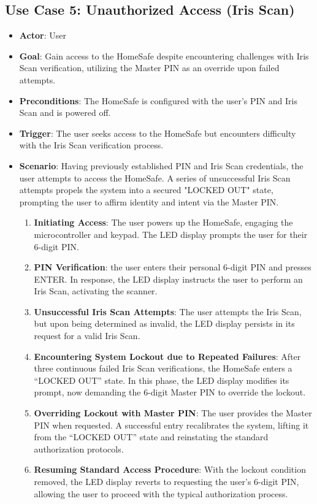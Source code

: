 \documentclass{article}
\begin{document}
\subsection{Use Case 5: Unauthorized Access (Iris Scan)}
\begin{itemize}
    \item \textbf{Actor}: User
    \item \textbf{Goal}: Gain access to the HomeSafe despite encountering challenges with Iris Scan verification, utilizing the Master PIN as an override upon failed attempts.
    \item \textbf{Preconditions}:  The HomeSafe is configured with the user’s PIN and Iris Scan and is powered off.
    \item \textbf{Trigger}: The user seeks access to the HomeSafe but encounters difficulty with the Iris Scan verification process.
    \item \textbf{Scenario}: Having previously established PIN and Iris Scan credentials, the user attempts to access the HomeSafe. A series of unsuccessful Iris Scan attempts propels the system into a secured "LOCKED OUT" state, prompting the user to affirm identity and intent via the Master PIN.
    \begin{enumerate}
    \item \textbf{Initiating Access}: The user powers up the HomeSafe, engaging the microcontroller and keypad. The LED display prompts the user for their 6-digit PIN.
    \item \textbf{PIN Verification}: the user enters their personal 6-digit PIN and presses ENTER. In response, the LED display instructs the user to perform an Iris Scan, activating the scanner.
    \item \textbf{Unsuccessful Iris Scan Attempts}: The user attempts the Iris Scan, but upon being determined as invalid, the LED display persists in its request for a valid Iris Scan.
    \item \textbf{Encountering System Lockout due to Repeated Failures}: After three continuous failed Iris Scan verifications, the HomeSafe enters a “LOCKED OUT” state. In this phase, the LED display modifies its prompt, now demanding the 6-digit Master PIN to override the lockout.
    \item \textbf{Overriding Lockout with Master PIN}: The user provides the Master PIN when requested. A successful entry recalibrates the system, lifting it from the “LOCKED OUT” state and reinstating the standard authorization protocols.
    \item \textbf{Resuming Standard Access Procedure}: With the lockout condition removed, the LED display reverts to requesting the user’s 6-digit PIN, allowing the user to proceed with the typical authorization process.
    \end{enumerate}
\end{itemize}

\newpage

\printbibliography

{\parindent0pt}
\end{document}
